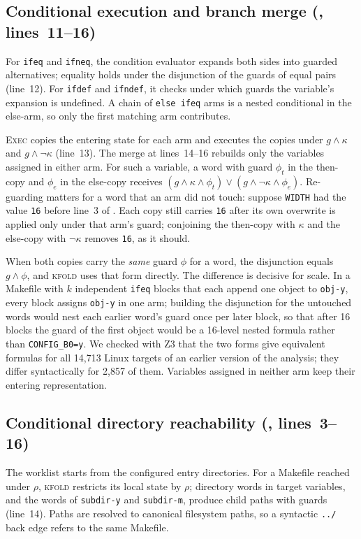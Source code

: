 \documentclass[acmsmall,screen,review]{acmart}
\newcommand{\tool}{\textsc{kfold}\xspace}
\begin{document}
\subsection{Conditional execution and branch merge (, lines~11--16)}
\label{sec:design:merge}
For \texttt{ifeq} and \texttt{ifneq}, the condition evaluator expands both sides into guarded alternatives; equality holds under the disjunction of the guards of equal pairs (line~12). For \texttt{ifdef} and \texttt{ifndef}, it checks under which guards the variable's expansion is undefined. A chain of \texttt{else ifeq} arms is a nested conditional in the else-arm, so only the first matching arm contributes.

\textsc{Exec} copies the entering state for each arm and executes the copies under $g\land\kappa$ and $g\land\neg\kappa$ (line~13). The merge at lines~14--16 rebuilds only the variables assigned in either arm. For such a variable, a word with guard $\phi_t$ in the then-copy and $\phi_e$ in the else-copy receives $(g\land\kappa\land\phi_t)\lor(g\land\neg\kappa\land\phi_e)$. Re-guarding matters for a word that an arm did not touch: suppose \texttt{WIDTH} had the value \texttt{16} before line~3 of . Each copy still carries \texttt{16} after its own overwrite is applied only under that arm's guard; conjoining the then-copy with $\kappa$ and the else-copy with $\neg\kappa$ removes \texttt{16}, as it should.

When both copies carry the \emph{same} guard $\phi$ for a word, the disjunction equals $g\land\phi$, and \tool uses that form directly. The difference is decisive for scale. In a Makefile with $k$ independent \texttt{ifeq} blocks that each append one object to \texttt{obj-y}, every block assigns \texttt{obj-y} in one arm; building the disjunction for the untouched words would nest each earlier word's guard once per later block, so that after 16 blocks the guard of the first object would be a 16-level nested formula rather than \texttt{CONFIG\_B0=y}. We checked with Z3 that the two forms give equivalent formulas for all 14,713 Linux targets of an earlier version of the analysis; they differ syntactically for 2,857 of them. Variables assigned in neither arm keep their entering representation.

\subsection{Conditional directory reachability (, lines~3--16)}
\label{sec:design:worklist}
The worklist starts from the configured entry directories. For a Makefile reached under $\rho$, \tool restricts its local state by $\rho$; directory words in target variables, and the words of \texttt{subdir-y} and \texttt{subdir-m}, produce child paths with guards (line~14). Paths are resolved to canonical filesystem paths, so a syntactic \texttt{../} back edge refers to the same Makefile.
\end{document}
